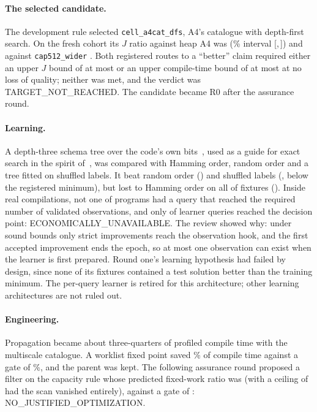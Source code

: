 \documentclass[11pt,a4paper]{article}
\newcommand{\ci}[2]{[#1,\,#2]}
\begin{document}
\paragraph{The selected candidate.} The development rule selected
\texttt{cell\_a4cat\_dfs}, A4's catalogue with depth-first search. On the fresh
cohort its $J$ ratio against heap A4 was  (\% interval
\ci{}{}) and against \texttt{cap512\_wider} .
Both registered routes to a ``better'' claim required either an upper $J$ bound of at
most  or an upper compile-time bound of at most  at no
loss of quality; neither was met, and the verdict was TARGET\_NOT\_REACHED. The
candidate became R0 after the assurance round.

\paragraph{Learning.} A depth-three schema tree over the code's own
bits~\cite{breiman1984}, used as a guide for exact search in the spirit
of~\cite{gasse2019}, was compared with Hamming order, random order and a tree fitted
on shuffled labels. It beat random order () and shuffled labels
(, below the registered minimum), but lost to Hamming order on all
 of  fixtures (). Inside real compilations, not
one of  programs had a query that reached the required number of
validated observations, and only  of  learner queries
reached the decision point: ECONOMICALLY\_UNAVAILABLE. The review showed why: under
sound bounds only strict improvements reach the observation hook, and the first
accepted improvement ends the epoch, so at most one observation can exist when the
learner is first prepared. Round one's learning hypothesis had failed by design,
since none of its  fixtures contained a test solution better than the
training minimum. The per-query learner is retired for this architecture; other
learning architectures are not ruled out.

\paragraph{Engineering.} Propagation became about three-quarters of profiled
compile time with the multiscale catalogue. A worklist fixed point saved
\% of compile time against a gate of \%, and the
parent was kept. The following assurance round proposed a filter on the capacity
rule whose predicted fixed-work ratio was  (with a ceiling of
 had the scan vanished entirely), against a gate of :
NO\_JUSTIFIED\_OPTIMIZATION.
\end{document}
